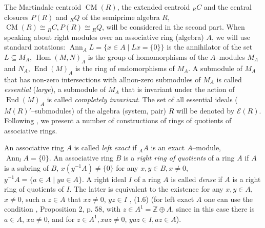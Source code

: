 \documentclass[a4paper,11pt]{article}
\DeclareMathOperator{\Hom}{Hom}
\DeclareMathOperator{\End}{End}
\DeclareMathOperator{\CM}{CM}
\DeclareMathOperator{\Ann}{Ann}
\begin{document}
The Martindale centroid $\CM(R)$, the extended centroid ${}_R C$ and the central 
closures $P(R)$ and ${}_R Q$ of the semiprime algebra $R$, 
${\CM(R)\cong {}_R C, P(R)\cong {}_R Q}$, will be considered in the second part. 
When speaking about right modules over an associative ring (algebra) $A$, we will 
use standard notations: ${\Ann_A L=\{x\in A\mid L x=\{0\}\}}$ is the annihilator 
of the set ${L\subseteq M_A}$, ${\Hom(M, N)_A}$ is the group of homomorphisms of 
the $A$--modules $M_A$ and $N_A$, $\End(M)_A$ is the ring of endomorphisms of 
$M_A$. A submodule of $M_A$ that has non-zero intersections with all\linebreak non-zero 
submodules of $M_A$ is called \emph{essential} (\emph{large}), a submodule of 
$M_A$ that is invariant under the action of $\End(M)_A$ is called 
\emph{completely invariant}. The set of all essential ideals ($M(R)'$--submodules) 
of the algebra (system, pair) $R$ will be denoted by $\mathcal{E}(R)$. Following 
\cite{Ut, Lamb, FeL}, we present a number of constructions of rings of quotients 
of associative rings. 

\smallskip
An associative ring $A$ is called \emph{left exact} if ${{}_A A}$ is an exact 
$A$--module, ${\Ann_l A=\{0\}}$. An associative ring $B$ is a \emph{right ring 
of quotients} of a ring $A$ if $A$ is a subring of $B$, 
${x (y^{-1} A)\ne \{0\}}$ for any ${x, y\in B, x\ne 0}$, 
${y^{-1} A=\{a\in A\mid y a\in A\}}$. A right ideal $I$ of a ring $A$ is called 
\emph{dense} if $A$ is a right ring of quotients of $I$. The latter is equivalent 
to the existence for any ${x, y\in A}$, ${x\ne 0}$, such a ${z\in A}$ that 
${x z\ne 0}$, ${y z\in I}$ \cite{Ut}, (1.6) (for left exact $A$ one can use 
the condition \cite{FeL}, Proposition 2, p. 58, with 
${z\in A^1=\mathbb{Z}\oplus A}$, since in this case there is ${a\in A}$, 
${x a\ne 0}$, and for ${z\in A^1, x a z\ne 0}$, ${y a z\in I, a z\in A}$). 
\end{document}
